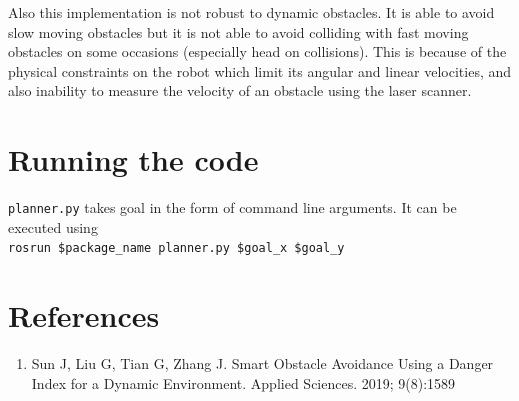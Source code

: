 \documentclass[11pt]{article}
\begin{document}
Also this implementation is not robust to dynamic obstacles. It is able to avoid slow moving obstacles but it is not able to 
avoid colliding with fast moving obstacles on some occasions (especially head on collisions).
This is because of the physical constraints on the robot which limit its angular and linear velocities, and also 
inability to measure the velocity of an obstacle using the laser scanner. 
\section{Running the code}
\texttt{planner.py} takes goal in the form of command line arguments. It can be executed using
 \\ \texttt{rosrun \${package\_name} planner.py \$goal\_x \$goal\_y} 
\section{References}
\begin{enumerate}
    \item \label{foo}Sun J, Liu G, Tian G, Zhang J. Smart Obstacle Avoidance Using a Danger Index for a Dynamic Environment. Applied Sciences. 2019; 9(8):1589
\end{enumerate}
\end{document}
